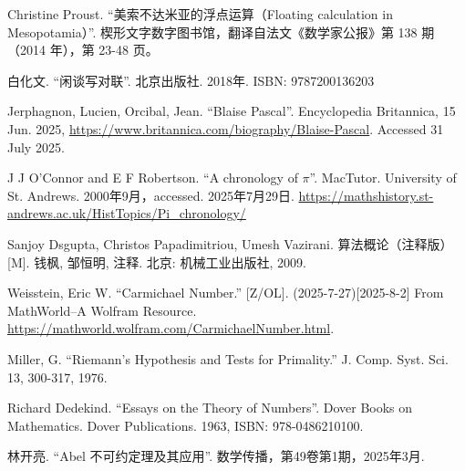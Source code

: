 Christine Proust. ``美索不达米亚的浮点运算（Floating calculation in Mesopotamia）''. 楔形文字数字图书馆，翻译自法文《数学家公报》第 138 期（2014 年），第 23-48 页。


白化文. ``闲谈写对联''. 北京出版社. 2018年. ISBN: 9787200136203

Jerphagnon, Lucien, Orcibal, Jean. ``Blaise Pascal''. Encyclopedia Britannica, 15 Jun. 2025, \url{https://www.britannica.com/biography/Blaise-Pascal}. Accessed 31 July 2025.


J J O'Connor and E F Robertson. ``A chronology of $\pi$''. MacTutor. University of St. Andrews. 2000年9月，accessed. 2025年7月29日. \url{https://mathshistory.st-andrews.ac.uk/HistTopics/Pi_chronology/}

Sanjoy Dsgupta, Christos Papadimitriou, Umesh Vazirani. 算法概论（注释版） [M]. 钱枫, 邹恒明, 注释. 北京: 机械工业出版社, 2009. %

Weisstein, Eric W. ``Carmichael Number.'' [Z/OL]. (2025-7-27)[2025-8-2] From MathWorld--A Wolfram Resource. \url{https://mathworld.wolfram.com/CarmichaelNumber.html}.

Miller, G. ``Riemann's Hypothesis and Tests for Primality.'' J. Comp. Syst. Sci. 13, 300-317, 1976.

Richard Dedekind. ``Essays on the Theory of Numbers''. Dover Books on Mathematics. Dover Publications. 1963, ISBN: 978-0486210100.

林开亮. ``Abel 不可约定理及其应用''. 数学传播，第49卷第1期，2025年3月.
